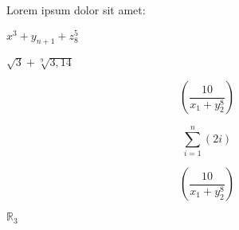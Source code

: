 \documentclass{report}
\begin{document}
Lorem ipsum dolor sit amet:

$ x^3 + y_{n+1} + z^5_8$

$ \sqrt{3} + \sqrt[9]{3,14} $

$$ \left(\frac{10}{x_1 + y^8_2}\right) $$

$$ \sum_{i=1}^n(2i) $$

\begin{equation}
	\left(\frac{10}{x_1 + y^8_2}\right) \tag{Vítkova věta}
\end{equation}

$ \mathbb{R}_3 $
\end{document}
